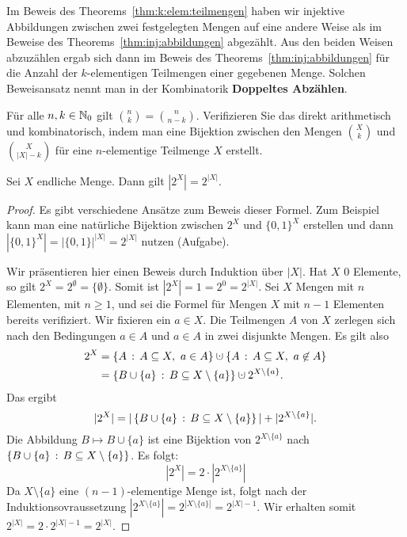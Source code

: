 \begin{bem} 
	Im Beweis des  Theorems~\ref{thm:k:elem:teilmengen} haben wir injektive Abbildungen zwischen zwei festgelegten Mengen auf eine andere Weise als im Beweise des Theorems~\ref{thm:inj:abbildungen} abgezählt. Aus den beiden Weisen abzuzählen ergab sich dann im Beweis des Theorems~\ref{thm:inj:abbildungen} für die Anzahl der $k$-elementigen Teilmengen einer gegebenen Menge. Solchen Beweisansatz nennt man in der Kombinatorik \textbf{Doppeltes Abzählen}. 
\end{bem} 

\begin{aufg}
	Für alle $n,k \in \mathbb{N}_0$ gilt $\binom{n}{k} = \binom{n}{n-k}$. Verifizieren Sie das direkt arithmetisch und kombinatorisch, indem man eine Bijektion zwischen 
	den Mengen $\binom{X}{k}$ und $\binom{X}{|X|-k}$ für eine $n$-elementige Teilmenge $X$ erstellt. 
\end{aufg} 


\begin{thm}
	Sei $X$ endliche Menge. Dann gilt $|2^X|=2^{|X|}$. 
\end{thm} 
\begin{proof} 
	Es gibt verschiedene Ansätze zum Beweis dieser Formel. Zum Beispiel kann man eine natürliche Bijektion zwischen  $2^X$ und $\{0,1\}^X$ erstellen und dann $|\{0,1\}^X| = |\{0,1\}|^{|X|} = 2^{|X|}$ nutzen (Aufgabe). 
	
	Wir präsentieren hier einen Beweis durch Induktion über $|X|$. Hat $X$ $0$ Elemente, so gilt $2^X = 2^\emptyset = \{\emptyset\}$. Somit ist $|2^X| = 1 = 2^0 = 2^{|X|}$. Sei $X$ Mengen mit $n$ Elementen, mit $n \ge 1$, und sei die Formel für Mengen $X$ mit $n-1$ Elementen bereits verifiziert. Wir fixieren ein $a \in X$. Die Teilmengen $A$ von $X$ zerlegen sich nach den Bedingungen $a \in A$ und $a \in A$ in zwei disjunkte Mengen. Es gilt also
	\begin{align*}
			2^X & = \setcond{A}{A \subseteq X, \ a \in A} \cupdot \setcond{A}{A \subseteq X, \ a \not\in A}
			\\ & = \setcond{B \cup \{a\}}{B \subseteq X \setminus \{a\}} \cupdot 2^{X \setminus \{a\}}. 
	\end{align*}
	Das ergibt
	\[
		|2^X| = |\left\{ B \cup \{a\} \,:\, B \subseteq X \setminus \{a\} \right\}| + | 2^{X \setminus \{a\}}|. 
	\]
	Die Abbildung $B \mapsto B \cup \{a\}$ ist eine Bijektion von $2^{X \setminus \{a\}}$ nach $\left\{ B \cup \{a\} \,:\, B \subseteq X \setminus \{a\} \right\}$. Es folgt: 
	\[
		|2^X| = 2 \cdot |2^{X \setminus \{a\}}|
	\]
	Da $X \setminus \{a\}$ eine $(n-1)$-elementige Menge ist, folgt nach der Induktionsovraussetzung $|2^{X \setminus \{a\}}| = 2^{|X \setminus \{a\}|} = 2^{|X|-1}$. Wir erhalten somit $2^{|X|} = 2 \cdot 2^{|X|-1} = 2^{|X|}$. 
\end{proof} 

